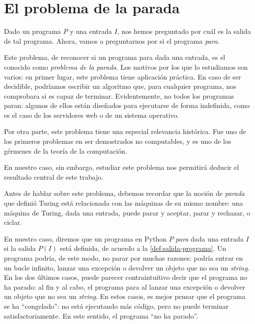 \section{El problema de la parada}\label{sec:problema-parada}

Dado un programa $P$ y una entrada $I$, nos hemos preguntado por cuál es la salida de tal programa. Ahora, vamos a preguntarnos por si el programa \emph{para}.

Este problema, de reconocer si un programa para dada una entrada, es el conocido como \emph{problema de la parada}. Los motivos por los que lo estudiamos son varios: en primer lugar, este problema tiene aplicación práctica. En caso de ser decidible, podríamos escribir un algoritmo que, para cualquier programa, nos comprobara si es capaz de terminar. Evidentemente, no todos los programas paran: algunos de ellos están diseñados para ejecutarse de forma indefinida, como es el caso de los servidores web o de un sistema operativo.

Por otra parte, este problema tiene una especial relevancia histórica. Fue uno de los primeros problemas en ser demostrados no computables, y es uno de los gérmenes de la teoría de la computación.

En nuestro caso, sin embargo, estudiar este problema nos permitirá deducir el resultado central de este trabajo.

Antes de hablar sobre este problema, debemos recordar que la noción de \emph{parada} que definió Turing está relacionada con las máquinas de su mismo nombre: una máquina de Turing, dada una entrada, puede parar y aceptar, parar y rechazar, o ciclar.

En nuestro caso, diremos que un programa en Python $P$ \emph{para} dada una entrada $I$ si la salida $P(I)$ está definida, de acuerdo a la \cref{def:salida-programa}. Un programa podría, de este modo, no parar por muchas razones: podría entrar en un bucle infinito, lanzar una excepción o devolver un objeto que no sea un \emph{string}. En los dos últimos casos, puede parecer contraintuitivo decir que el programa no ha parado: al fin y al cabo, el programa para al lanzar una excepción o devolver un objeto que no sea un \emph{string}. En estos casos, es mejor pensar que el programa se ha ``congelado'': no está ejecutando más código, pero no puede terminar satisfactoriamente. En este sentido, el programa ``no ha parado''.

